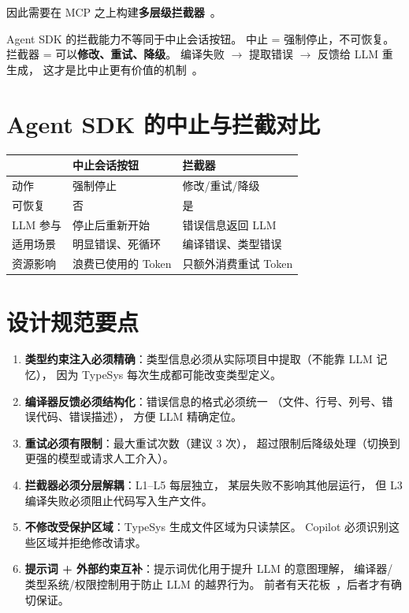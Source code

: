 \documentclass[10pt, openany]{book}
\begin{document}
因此需要在 MCP 之上构建\textbf{多层级拦截器}~\cite{Wu2024AutoGen}。

\begin{principle}
Agent SDK 的拦截能力不等同于中止会话按钮。
中止 = 强制停止，不可恢复。
拦截器 = 可以\textbf{修改、重试、降级}。
编译失败 \(\rightarrow\) 提取错误 \(\rightarrow\) 反馈给 LLM 重生成，
这才是比中止更有价值的机制~\cite{Wang2023SelfRefine}。
\end{principle}

\section{Agent SDK 的中止与拦截对比}

\begin{table}[h]
\centering
\begin{tabular}{p{3cm} p{5cm} p{5cm}}
\toprule
& \textbf{中止会话按钮} & \textbf{拦截器} \\
\midrule
动作 & 强制停止 & 修改/重试/降级 \\
可恢复 & 否 & 是 \\
LLM 参与 & 停止后重新开始 & 错误信息返回 LLM \\
适用场景 & 明显错误、死循环 & 编译错误、类型错误 \\
资源影响 & 浪费已使用的 Token & 只额外消费重试 Token \\
\bottomrule
\end{tabular}
\end{table}

\section{设计规范要点}

\begin{enumerate}
    \item \textbf{类型约束注入必须精确}：类型信息必须从实际项目中提取（不能靠 LLM 记忆），
        因为 TypeSys 每次生成都可能改变类型定义。
    
    \item \textbf{编译器反馈必须结构化}：错误信息的格式必须统一
        （文件、行号、列号、错误代码、错误描述），
        方便 LLM 精确定位。
    
    \item \textbf{重试必须有限制}：最大重试次数（建议 3 次），
        超过限制后降级处理（切换到更强的模型或请求人工介入）。
    
    \item \textbf{拦截器必须分层解耦}：L1--L5 每层独立，
        某层失败不影响其他层运行，
        但 L3 编译失败必须阻止代码写入生产文件。
    
    \item \textbf{不修改受保护区域}：TypeSys 生成文件区域为只读禁区。
        Copilot 必须识别这些区域并拒绝修改请求。
        
    \item \textbf{提示词 + 外部约束互补}：提示词优化用于提升 LLM 的意图理解，
        编译器/类型系统/权限控制用于防止 LLM 的越界行为。
        前者有天花板~\cite{Liu2023LostInMiddle}，后者才有确切保证。
\end{enumerate}
\end{document}

